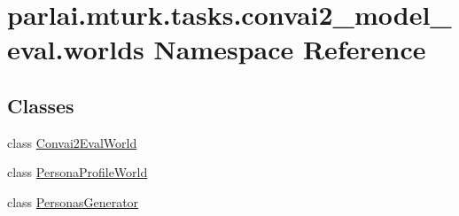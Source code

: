 \hypertarget{namespaceparlai_1_1mturk_1_1tasks_1_1convai2__model__eval_1_1worlds}{}\section{parlai.\+mturk.\+tasks.\+convai2\+\_\+model\+\_\+eval.\+worlds Namespace Reference}
\label{namespaceparlai_1_1mturk_1_1tasks_1_1convai2__model__eval_1_1worlds}
\subsection*{Classes}
\begin{DoxyCompactItemize}
\item 
class \hyperlink{classparlai_1_1mturk_1_1tasks_1_1convai2__model__eval_1_1worlds_1_1Convai2EvalWorld}{Convai2\+Eval\+World}
\item 
class \hyperlink{classparlai_1_1mturk_1_1tasks_1_1convai2__model__eval_1_1worlds_1_1PersonaProfileWorld}{Persona\+Profile\+World}
\item 
class \hyperlink{classparlai_1_1mturk_1_1tasks_1_1convai2__model__eval_1_1worlds_1_1PersonasGenerator}{Personas\+Generator}
\end{DoxyCompactItemize}
